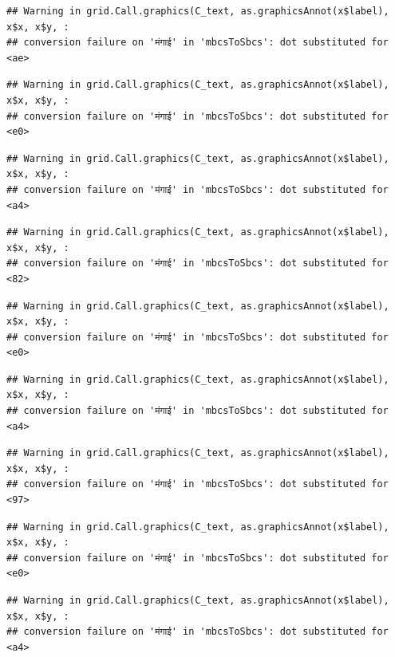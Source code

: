 \documentclass[
]{article}
\begin{document}
\begin{verbatim}
## Warning in grid.Call.graphics(C_text, as.graphicsAnnot(x$label), x$x, x$y, :
## conversion failure on 'मंगाई' in 'mbcsToSbcs': dot substituted for <ae>
\end{verbatim}

\begin{verbatim}
## Warning in grid.Call.graphics(C_text, as.graphicsAnnot(x$label), x$x, x$y, :
## conversion failure on 'मंगाई' in 'mbcsToSbcs': dot substituted for <e0>
\end{verbatim}

\begin{verbatim}
## Warning in grid.Call.graphics(C_text, as.graphicsAnnot(x$label), x$x, x$y, :
## conversion failure on 'मंगाई' in 'mbcsToSbcs': dot substituted for <a4>
\end{verbatim}

\begin{verbatim}
## Warning in grid.Call.graphics(C_text, as.graphicsAnnot(x$label), x$x, x$y, :
## conversion failure on 'मंगाई' in 'mbcsToSbcs': dot substituted for <82>
\end{verbatim}

\begin{verbatim}
## Warning in grid.Call.graphics(C_text, as.graphicsAnnot(x$label), x$x, x$y, :
## conversion failure on 'मंगाई' in 'mbcsToSbcs': dot substituted for <e0>
\end{verbatim}

\begin{verbatim}
## Warning in grid.Call.graphics(C_text, as.graphicsAnnot(x$label), x$x, x$y, :
## conversion failure on 'मंगाई' in 'mbcsToSbcs': dot substituted for <a4>
\end{verbatim}

\begin{verbatim}
## Warning in grid.Call.graphics(C_text, as.graphicsAnnot(x$label), x$x, x$y, :
## conversion failure on 'मंगाई' in 'mbcsToSbcs': dot substituted for <97>
\end{verbatim}

\begin{verbatim}
## Warning in grid.Call.graphics(C_text, as.graphicsAnnot(x$label), x$x, x$y, :
## conversion failure on 'मंगाई' in 'mbcsToSbcs': dot substituted for <e0>
\end{verbatim}

\begin{verbatim}
## Warning in grid.Call.graphics(C_text, as.graphicsAnnot(x$label), x$x, x$y, :
## conversion failure on 'मंगाई' in 'mbcsToSbcs': dot substituted for <a4>
\end{verbatim}
\end{document}
